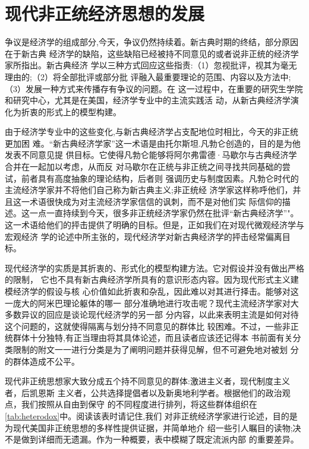 \chapter{现代非正统经济思想的发展}

争议是经济学的组成部分,今天，争议仍然持续着。新古典时期的终结，部分原因在于新古典
经济学的缺陷，这些缺陷已经被持不同意见的或者说非正统的经济学家所指出。新古典经济
学以三种方式回应这些指责:（1）忽视批评，视其为毫无理由的;（2）将全部批评或部分批
评融入最重要理论的范围、内容以及方法中;（3）发展一种方式来传播存有争议的问题。在
这一过程中，在重要的研究生学院和研究中心，尤其是在美国，经济学专业中的主流实践活
动，从新古典经济学演化为折衷的形式上的模型构建。

由于经济学专业中的这些变化,与新古典经济学占支配地位时相比，今天的非正统更加困
难。“新古典经济学家”这一术语是由托尔斯坦.凡勃仑创造的，目的是为他发表不同意见提
供目标。它使得凡勃仑能够将阿尔弗雷德·马歇尔与古典经济学合并在一起加以考虑，从而反
对马歇尔在正统与非正统之间寻找共同基础的尝试，前者具有高度抽象的理论结构，后者则
强调历史与制度因素。凡勃仑时代的主流经济学家并不将他们自己称为新古典主义;非正统经
济学家这样称呼他们，并且这一术语很快成为对主流经济学家信信的讽刺，而不是对他们实
际信仰的描述。这一点一直持续到今天，很多非正统经济学家仍然在批评“新古典经济学”"。
这一术语给他们的抨击提供了明确的目标。但是，正如我们在对现代微观经济学与宏观经济
学的论述中所主张的，现代经济学对新古典经济学的抨击经常偏离目标。

现代经济学的实质是其折衷的、形式化的模型构建方法。它对假设并没有做出严格的限制，
它也不具有新古典经济学所具有的意识形态内容。因为现代形式主义建模经济学的假设与核
心价值如此折衷和杂乱，因此难以对其进行择击。能够对这一庞大的阿米巴理论躯体的哪一
部分准确地进行攻击呢？现代主流经济学家对大多数异议的回应是谈论现代经济学的另一部
分内容，以此来表明主流是如何对待这个问题的，这就使得隔离与划分持不同意见的群体比
较困难。不过，一些非正统群体十分独特,有正当理由将其具体论述，而且读者应该还记得本
书前面有关分类限制的附文一一进行分类是为了阐明问题并获得见解，但不可避免地对被划
分的群体造成不公平。

现代非正统思想家大致分成五个持不同意见的群体:激进主义者，现代制度主义者，后凯恩斯
主义者，公共选择提倡者以及新奥地利学者。根据他们的政治观点，我们按照从自由到保守
的不同程度进行排列，将这些群体组织在\cref{tab:heterodox}中。阅读该表时请记住,我们
对非正统经济学家进行论述，目的是为现代美国非正统思想的多样性提供证据，并简单地介
绍一些引人瞩目的读物;决不是做到详细而无遗漏。作为一种概要，表中模糊了既定流派内部
的重要差异。


